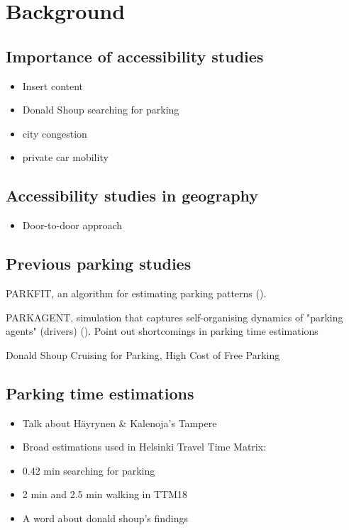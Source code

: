 \section{Background}
\subsection{Importance of accessibility studies}
\justify

\begin{itemize}
    \item Insert content
    \item Donald Shoup searching for parking
    \item city congestion
    \item private car mobility
\end{itemize}

\newpage
\subsection{Accessibility studies in geography}
\justify

\begin{itemize}
  \item Door-to-door approach
\end{itemize}

\newpage
\subsection{Previous parking studies}
\justify

PARKFIT, an algorithm for estimating parking patterns (\cite{Levy2015}).

PARKAGENT, simulation that captures self-organising dynamics of "parking agents" (drivers) (\cite{Benenson2008}). Point out shortcomings in parking time estimations

Donald Shoup Cruising for Parking, High Cost of Free Parking

\newpage
\subsection{Parking time estimations}
\justify

\begin{itemize}
  \item Talk about Häyrynen \& Kalenoja's Tampere
  \item Broad estimations used in Helsinki Travel Time Matrix:
  \item 0.42 min searching for parking
  \item 2 min and 2.5 min walking in TTM18
  \item A word about donald shoup's findings
\end{itemize}

